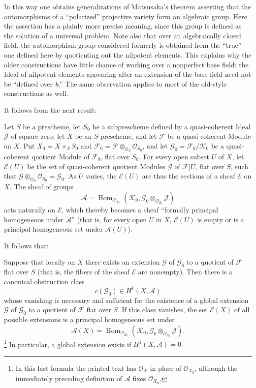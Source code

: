 In this way one obtains generalizations of Matsusaka's theorem asserting that
the automorphisms of a “polarized” projective variety form an algebraic group.
Here the assertion has a plainly more precise meaning, since this group is
defined as the solution of a universal problem. Note also that over an
algebraically closed field, the automorphism group considered formerly is
obtained from the “true” one defined here by quotienting out the nilpotent
elements. This explains why the older constructions have little chance of
working over a nonperfect base field: the Ideal of nilpotent elements appearing
after an extension of the base field need not be “defined over $k$.” The same
observation applies to most of the old-style constructions as well.


It follows from the next result:

 Let $S$ be a prescheme, let $S_0$ be a subprescheme
defined by a quasi-coherent Ideal $\mathcal J$ of square zero, let $X$ be an
$S$-prescheme, and let $\mathcal F$ be a quasi-coherent Module on $X$. Put
$X_0=X\times_SS_0$ and
$\mathcal F_0=\mathcal F\otimes_{\mathcal O_S}\mathcal O_{S_0}$, and let
$\mathcal G_0=\mathcal F_0/\mathcal K_0$ be a quasi-coherent quotient Module of
$\mathcal F_0$, flat over $S_0$. For every open subset $U$ of $X$, let
$\mathcal E(U)$ be the set of quasi-coherent quotient Modules $\mathcal G$ of
$\mathcal F|U$, flat over $S$, such that
$\mathcal G\otimes_{\mathcal O_S}\mathcal O_{S_0}=\mathcal G_0$. As $U$
varies, the $\mathcal E(U)$ are thus the sections of a sheaf $\mathcal E$ on
$X$. The sheaf of groups
\[
\mathcal A=\operatorname{Hom}_{\mathcal O_{X_0}}
(\mathcal K_0,\mathcal G_0\otimes_{\mathcal O_{S_0}}\mathcal J)
\]
acts naturally on $\mathcal E$, which thereby becomes a sheaf “formally
principal homogeneous under $\mathcal A$” (that is, for every open $U$ in $X$,
$\mathcal E(U)$ is empty or is a principal homogeneous set under
$\mathcal A(U)$).

It follows that:

 Suppose that locally on $X$ there exists an extension
$\mathcal G$ of $\mathcal G_0$ to a quotient of $\mathcal F$ flat over $S$
(that is, the fibers of the sheaf $\mathcal E$ are nonempty). Then there is a
canonical obstruction class
\[
c(\mathcal G_0)\in H^1(X,\mathcal A)
\]
whose vanishing is necessary and sufficient for the existence of a global
extension $\mathcal G$ of $\mathcal G_0$ to a quotient of $\mathcal F$ flat
over $S$. If this class vanishes, the set $\mathcal E(X)$ of all possible
extensions is a principal homogeneous set under
\[
\mathcal A(X)=\operatorname{Hom}_{\mathcal O_{X_0}}
(\mathcal K_0,\mathcal G_0\otimes_{\mathcal O_{S_0}}\mathcal J).
\]
\footnote{In this last formula the printed text has $\mathcal O_X$ in place of
$\mathcal O_{X_0}$, although the immediately preceding definition of
$\mathcal A$ fixes $\mathcal O_{X_0}$.}
In particular, a global extension exists if $H^1(X,\mathcal A)=0$.

